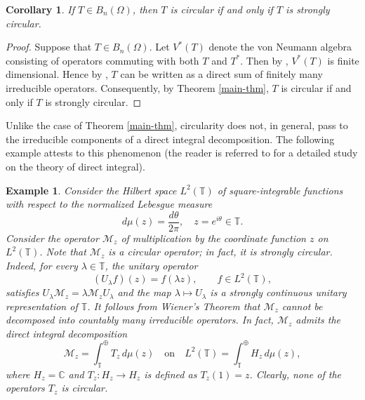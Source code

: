 \documentclass[10pt,a4paper]{amsart}
\newtheorem{corollary}[theorem]{Corollary}%
\newtheorem{example}[theorem]{Example}
\begin{document}
\begin{corollary}
If $T \in B_n(\Omega)$, then $T$ is circular if and only if $T$ is strongly circular.
\end{corollary}

\begin{proof}
Suppose that $T \in B_n(\Omega)$. Let $V^*(T)$ denote the von Neumann algebra consisting of operators commuting with both $T$ and $T^*$. Then by \cite[Corollary 3.7]{CDG}, $V^*(T)$ is finite dimensional. Hence by \cite[Corollary 3.2]{FJW}, $T$ can be written as a direct sum of finitely many irreducible operators. Consequently, by Theorem \ref{main-thm}, $T$ is circular if and only if $T$ is strongly circular.
\end{proof}

Unlike the case of Theorem \ref{main-thm}, circularity does not, in general, pass to the irreducible components of a direct integral decomposition. The following example attests to this phenomenon (the reader is referred to \cite{D} for a detailed study on the theory of direct integral). 
\begin{example}\label{direct-integral}
Consider the Hilbert space $L^2(\mathbb T)$ of square-integrable functions with respect to the normalized Lebesgue measure
\[
d\mu(z)=\frac{d\theta}{2\pi}, \quad z=e^{i\theta}\in\mathbb T.
\]
Consider the operator $\mathscr M_z$ of multiplication by the coordinate function $z$ on $L^2(\mathbb T)$. Note that $\mathscr M_z$ is a circular operator; in fact, it is strongly circular. Indeed, for every $\lambda\in\mathbb T$, the unitary operator
\[
(U_\lambda f)(z)=f(\lambda z), \qquad f\in L^2(\mathbb T),
\]
satisfies $U_\lambda \mathscr M_z = \lambda \mathscr M_{z} U_\lambda$ and the map $\lambda \mapsto U_\lambda$ is a strongly continuous unitary representation of $\mathbb T$. It follows from Wiener's Theorem \cite[Theorem 1.2.1]{N} that $\mathscr M_z$ cannot be decomposed into countably many irreducible operators. In fact, $\mathscr M_z$ admits the direct integral decomposition
\[
\mathscr M_z
=\int_{\mathbb T}^{\oplus} T_z\, d\mu(z)
\quad \text{on} \quad
L^2(\mathbb T)
=
\int_{\mathbb T}^{\oplus} H_z\, d\mu(z),
\]
where $H_z=\mathbb C$ and $T_z:H_z\to H_z$ is defined as $T_z(1)=z
$. Clearly, none of the operators $T_z$ is circular.
\end{example}
\end{document}
